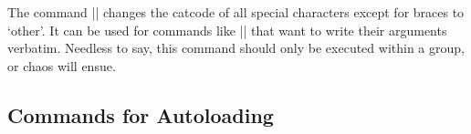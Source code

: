 \begin{macro}{\@dblarg}
\begin{macro}{\@xdblarg}

\begin{teX}
\long\def\@dblarg#1{\kernel@ifnextchar[{#1}{\@xdblarg{#1}}}
\long{}
\end{teX}
\end{macro}
\end{macro}
%
\begin{macro}{\@sanitize}

 The command |\@sanitize| changes the catcode of all special characters
 except for braces to `other'.  It can be used for commands like
 |\index| that want to write their arguments verbatim.  Needless to
 say, this command should only be executed within a group, or chaos
 will ensue.

\begin{teX}
\def\@sanitize{\@makeother\ \@makeother\\\@makeother\$\@makeother\&%
\@makeother\#\@makeother\^\@makeother\_\@makeother\%\@makeother\~}
\end{teX}
\end{macro}
%

 \subsection{Commands for Autoloading}



